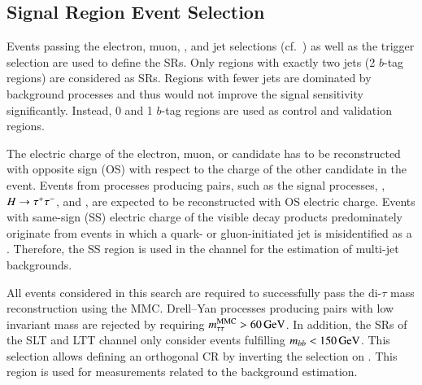 



\subsection{Signal Region Event Selection}%
\label{sec:sr_and_cr_selection}

Events passing the electron, muon, \tauhadvis, and jet selections
(cf.~) as well as the trigger selection are used to
define the SRs. Only regions with exactly two \btagged jets (2 $b$-tag regions)
are considered as SRs. Regions with fewer \btagged jets are dominated by
background processes and thus would not improve the signal sensitivity
significantly. Instead, 0 and 1 $b$-tag regions are used as control and
validation regions.

The electric charge of the electron, muon, or \tauhadvis candidate has to be
reconstructed with opposite sign (OS) with respect to the charge of the other
\tauhadvis candidate in the event. Events from processes producing \tauleptonC
pairs, such as the signal processes, \Zjets, $H \to \tau^{+} \tau^{-}$, and \ttbar, are
expected to be reconstructed with OS electric charge. Events with same-sign (SS)
electric charge of the visible \tauleptonC decay products predominately originate
from events in which a quark- or gluon-initiated jet is misidentified as a
\tauhadvis. Therefore, the SS region is used in the \hadhad channel for the
estimation of multi-jet backgrounds.

All events considered in this search are required to successfully pass the
di-$\tau$ mass reconstruction using the MMC. Drell--Yan processes producing
\tauleptonC pairs with low invariant mass are rejected by requiring
$m_{\tau\tau}^\text{MMC} > \SI{60}{\ensuremath{\text{GeV}}}$. In addition, the SRs of the \lephad SLT and LTT channel
only consider events fulfilling $m_{bb} < \SI{150}{\ensuremath{\text{GeV}}}$. This selection allows
defining an orthogonal \ttbar CR by inverting the selection on \mBB. This region
is used for measurements related to the \faketauhadvisC background estimation.

